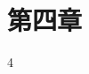 \documentclass[supercite]{upcthesis}
\begin{document}
\fi

\section{第四章}

4





\ifx\compileAllFiles\undefined
\end{document}
